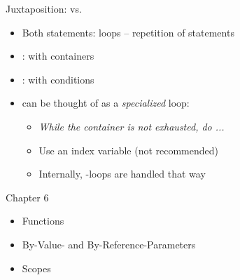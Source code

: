 
\begin{frame}{Juxtaposition:  vs. }
%
\begin{itemize}
\item Both statements: loops -- repetition of statements
\item {}: with containers
\item {}: with conditions
\item {} can be thought of as a \emph{specialized}  loop:
	\begin{itemize}
	\item \emph{While the container is not exhausted, do ...}
	\item Use an index variable (not recommended)
	\item Internally, -loops are handled that way
	\end{itemize}
\end{itemize}
%
\end{frame}


\begin{frame}
%
%
\end{frame}


\begin{frame}[fragile]{Chapter 6}
%
\begin{itemize}
\item Functions
\item By-Value- and By-Reference-Parameters
\item Scopes
\end{itemize}
%
\end{frame}


